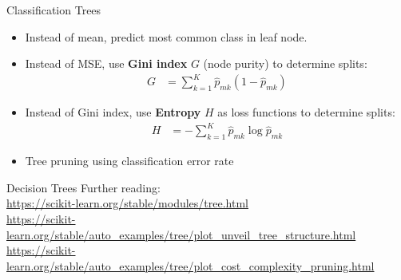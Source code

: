 \documentclass[ignorenonframetext,xcolor=x11names]{beamer}
\begin{document}


\begin{frame}{Classification Trees}
\begin{itemize}
   \item Instead of mean, predict most common class in leaf node.
   \item Instead of MSE, use \textbf{Gini index} $G$ (node purity) to determine splits:
   \begin{align*}
   G &= \sum_{k=1}^K \hat{p}_{mk}(1 - \hat{p}_{mk})
   \end{align*} 
   \item Instead of Gini index, use \textbf{Entropy} $H$ as loss functions to determine splits:
   \begin{align*}
   H &= - \sum_{k=1}^K \hat{p}_{mk} \log \hat{p}_{mk} 
   \end{align*}
   \item Tree pruning using classification error rate
\end{itemize}
\end{frame}

\begin{frame}{Decision Trees}
Further reading: \\

\small
\url{https://scikit-learn.org/stable/modules/tree.html} \\

\url{https://scikit-learn.org/stable/auto_examples/tree/plot_unveil_tree_structure.html} \\

\url{https://scikit-learn.org/stable/auto_examples/tree/plot_cost_complexity_pruning.html}
\end{frame}
\end{document}
